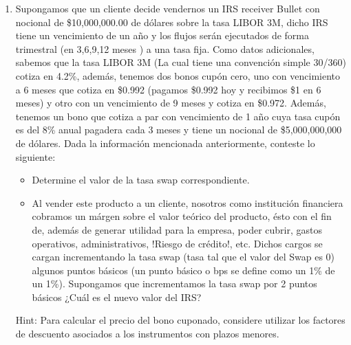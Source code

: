 \documentclass{article}
\begin{document}
\begin{enumerate}
\begin{itemize}
    \end{itemize}



\item Supongamos que un cliente decide vendernos un IRS receiver Bullet con nocional de \$10,000,000.00 de dólares sobre la tasa LIBOR 3M, dicho IRS tiene un vencimiento
      de un año y los flujos serán ejecutados de forma trimestral (en 3,6,9,12 meses ) a una tasa fija. Como datos
      adicionales, sabemos que la tasa LIBOR 3M (La cual tiene una convención simple 30/360) cotiza en 4.2\%, además, tenemos dos bonos cupón cero,
      uno con vencimiento a 6 meses que cotiza en \$0.992 (pagamos \$0.992 hoy y recibimos \$1 en 6 meses) y otro con un vencimiento de 9 meses y cotiza en \$0.972. Además,
      tenemos un bono que cotiza a par con vencimiento de 1 año cuya tasa cupón es del 8\% anual pagadera cada 3 meses y tiene un nocional de \$5,000,000,000 de dólares.
      Dada la información mencionada anteriormente, conteste lo siguiente:
      \begin{itemize}
        \item Determine el valor de la tasa swap correspondiente.
        \item Al vender este producto a un cliente, nosotros como institución financiera cobramos un márgen sobre el valor teórico
              del producto, ésto con el fin de, además de generar utilidad para la empresa, poder cubrir, gastos operativos, administrativos, !Riesgo de crédito!, etc. Dichos cargos se cargan incrementando la tasa swap (tasa tal que el 
              valor del Swap es 0) algunos puntos básicos (un punto básico o bps se define como un 1\% de un 1\%). Supongamos que incrementamos la tasa swap por 2 puntos básicos ¿Cuál es el nuevo valor del IRS?
      \end{itemize}
      

      Hint: Para calcular el precio del bono cuponado, considere utilizar los factores de descuento asociados a los instrumentos con plazos menores.
\end{enumerate}
\end{document}
